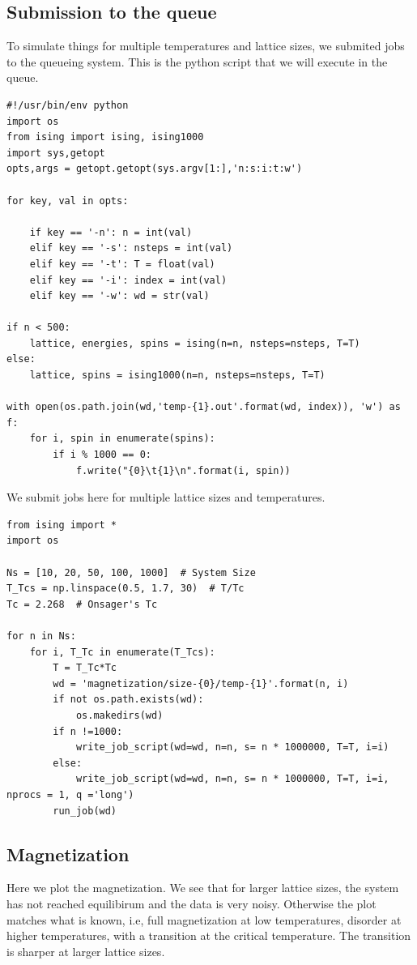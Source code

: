 \documentclass{article}
\begin{document}
\subsection{Submission to the queue}
\label{sec-5-1}

To simulate things for multiple temperatures and lattice sizes, we submited jobs to the queueing system. This is the python script that we will execute in the queue.

\begin{verbatim}
#!/usr/bin/env python
import os
from ising import ising, ising1000
import sys,getopt
opts,args = getopt.getopt(sys.argv[1:],'n:s:i:t:w')

for key, val in opts:

    if key == '-n': n = int(val)
    elif key == '-s': nsteps = int(val)
    elif key == '-t': T = float(val)
    elif key == '-i': index = int(val)
    elif key == '-w': wd = str(val)

if n < 500:
    lattice, energies, spins = ising(n=n, nsteps=nsteps, T=T)
else:
    lattice, spins = ising1000(n=n, nsteps=nsteps, T=T)
    
with open(os.path.join(wd,'temp-{1}.out'.format(wd, index)), 'w') as f:
    for i, spin in enumerate(spins):
        if i % 1000 == 0:
            f.write("{0}\t{1}\n".format(i, spin))
\end{verbatim}

We submit jobs here for multiple lattice sizes and temperatures.

\begin{verbatim}
from ising import *
import os

Ns = [10, 20, 50, 100, 1000]  # System Size
T_Tcs = np.linspace(0.5, 1.7, 30)  # T/Tc
Tc = 2.268  # Onsager's Tc

for n in Ns:
    for i, T_Tc in enumerate(T_Tcs):
        T = T_Tc*Tc
        wd = 'magnetization/size-{0}/temp-{1}'.format(n, i)
        if not os.path.exists(wd): 
            os.makedirs(wd)
        if n !=1000:
            write_job_script(wd=wd, n=n, s= n * 1000000, T=T, i=i)
        else:
            write_job_script(wd=wd, n=n, s= n * 1000000, T=T, i=i, nprocs = 1, q ='long')
        run_job(wd)
\end{verbatim}

\subsection{Magnetization}
\label{sec-5-2}
Here we plot the magnetization. We see that for larger lattice sizes, the system has not reached equilibirum and the data is very noisy. Otherwise the plot matches what is known, i.e, full magnetization at low temperatures, disorder at higher temperatures, with a transition at the critical temperature. The transition is sharper at larger lattice sizes. 
\end{document}
